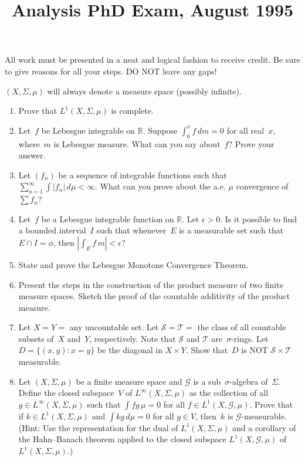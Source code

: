 \documentclass[11pt,letterpaper]{article}
\title{Analysis PhD Exam, August 1995}
\author{}
\date{}
\newenvironment{examproblems}[2]{%
  \def\ProblemHeadingTag{#2}%
  \AssignTaggingSocketPlug{block/list/label}{examproblem}%
  \begin{enumerate}%
  \setcounter{enumi}{#1}%
  \renewcommand{\labelenumi}{\textbf{\theenumi.}}%
  \setlength{\topsep}{0.35em}%
  \setlength{\partopsep}{0pt}%
  \setlength{\itemsep}{0.48em}%
  \setlength{\parsep}{0.18em}%
}{\end{enumerate}}
\newenvironment{examinstructions}{%
  \par\begingroup\itshape
}{%
  \par\endgroup\vspace{0.18em}
}
\begin{document}
\maketitle
\thispagestyle{empty}
\begin{examinstructions}
All work must be presented in a neat and logical fashion to receive credit. Be sure to give reasons for all your steps. DO NOT leave any gaps!
\end{examinstructions}
\begin{examinstructions}
\((X,\Sigma,\mu)\) will always denote a measure space (possibly infinite).
\end{examinstructions}
\begin{examproblems}{0}{H2}
\def\ProblemHeadingText{Problem 1.}
\item
Prove that \(L^1(X,\Sigma,\mu)\) is complete.
\def\ProblemHeadingText{Problem 2.}
\item
Let~\(f\) be Lebesgue integrable on \(\mathbb R\). Suppose \(\int_0^x f\,dm=0\) for all real~\(x\), where~\(m\) is Lebesgue measure. What can you say about~\(f\)? Prove your answer.
\def\ProblemHeadingText{Problem 3.}
\item
Let \((f_n)\) be a sequence of integrable functions such that \(\sum_{n=1}^{\infty}\int |f_n|\,d\mu<\infty\). What can you prove about the a.e. \(\mu\) convergence of \(\sum f_n\)?
\def\ProblemHeadingText{Problem 4.}
\item
Let~\(f\) be a Lebesgue integrable function on \(\mathbb R\). Let \(\epsilon>0\). Is it possible to find a bounded interval~\(I\) such that whenever~\(E\) is a measurable set such that \(E\cap I=\phi\), then \(\left|\int_E f\,m\right|<\epsilon\)?
\def\ProblemHeadingText{Problem 5.}
\item
State and prove the Lebesgue Monotone Convergence Theorem.
\def\ProblemHeadingText{Problem 6.}
\item
Present the steps in the construction of the product measure of two finite measure spaces. Sketch the proof of the countable additivity of the product measure.
\def\ProblemHeadingText{Problem 7.}
\item
Let \(X=Y=\) any uncountable set. Let \(\mathcal S=\mathcal T=\) the class of all countable subsets of~\(X\) and~\(Y\), respectively. Note that \(\mathcal S\) and \(\mathcal T\) are~\(\sigma\)-rings. Let \(D=\{(x,y):x=y\}\) be the diagonal in \(X\times Y\). Show that~\(D\) is NOT \(\mathcal S\times\mathcal T\) measurable.
\def\ProblemHeadingText{Problem 8.}
\item
Let \((X,\Sigma,\mu)\) be a finite measure space and \(\mathcal G\) is a sub~\(\sigma\)-algebra of~\(\Sigma\). Define the closed subspace~\(V\) of \(L^\infty(X,\Sigma,\mu)\) as the collection of all \(g\in L^\infty(X,\Sigma,\mu)\) such that \(\int fg\,\mu=0\) for all \(f\in L^1(X,\mathcal G,\mu)\). Prove that if \(k\in L^1(X,\Sigma,\mu)\) and \(\int kg\,d\mu=0\) for all \(g\in V\), then~\(k\) is \(\mathcal G\)-measurable. (Hint: Use the representation for the dual of \(L^1(X,\Sigma,\mu)\) and a corollary of the Hahn–Banach theorem applied to the closed subspace \(L^1(X,\mathcal G,\mu)\) of \(L^1(X,\Sigma,\mu)\).)
\end{examproblems}
\end{document}
